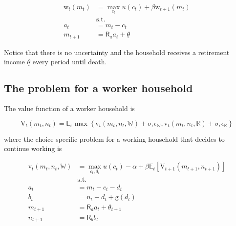 \documentclass{article}
\newcommand{\DiscFac}{\beta}
\newcommand{\VFunc}{\mathrm{V}}
\newcommand{\util}{u}
\newcommand{\tShkEmp}{\theta}
\newcommand{\Ex}{\mathbb{E}}
\newcommand{\bRat}{b}
\newcommand{\cRat}{c}
\newcommand{\vFunc}{\mathrm{v}}
\newcommand{\Rfree}{\mathsf{R}}
\newcommand{\aRat}{a}
\newcommand{\mRat}{m}
\newcommand{\nRat}{n}
\newcommand{\dRat}{d}
\newcommand{\gFunc}{\mathrm{g}}
\newcommand{\wFunc}{\mathrm{w}}
\newcommand{\Retire}{\mathbb{R}}
\newcommand{\Work}{\mathbb{W}}
\newcommand{\error}{\epsilon}
\newcommand{\kapShare}{\alpha}
\begin{document}
\begin{equation}
\begin{split}
        \wFunc_{t}(\mRat_{t}) & = \max_{\cRat_{t}} \util(\cRat_{t}) +
        \DiscFac \wFunc_{t+1}(\mRat_{t}) \\
        & \text{s.t.} \\
        \aRat_{t} & = \mRat_{t} - \cRat_{t} \\
        \mRat_{t+1} & = \Rfree_{\aRat} \aRat_{t} +
        \underline{\tShkEmp}
    \end{split}
\end{equation}

Notice that there is no uncertainty and the household receives a retirement
income $\underline{\tShkEmp}$ every period until death.

\subsection{The problem for a worker household}\label{The problem for a worker household}

The value function of a worker household is

\begin{equation}
\VFunc_{t}(\mRat_{t}, \nRat_{t}) = \Ex_\error \max \left\{
    \vFunc_{t}(\mRat_{t}, \nRat_{t}, \Work) + \sigma_{\error}
    \error_{\Work} ,
    \vFunc_{t}(\mRat_{t}, \nRat_{t}, \Retire) + \sigma_{\error}
    \error_{\Retire} \right\}
\end{equation}

where the choice specific problem for a working household that decides to
continue working is

\begin{equation}
\begin{split}
        \vFunc_{t}(\mRat_{t}, \nRat_{t}, \Work) & = \max_{\cRat_{t},
            \dRat_{t}} \util(\cRat_{t}) - \kapShare + \DiscFac
        \Ex_{t} \left[
            \VFunc_{t+1}(\mRat_{t+1}, \nRat_{t+1})
            \right] \\
        & \text{s.t.} \\
        \aRat_{t} & = \mRat_{t} - \cRat_{t} - \dRat_{t} \\
        \bRat_{t} & = \nRat_{t} + \dRat_{t} + \gFunc(\dRat_{t}) \\
        \mRat_{t+1} & = \Rfree_{\aRat} \aRat_{t} + \tShkEmp_{t+1} \\
        \nRat_{t+1} & = \Rfree_{\bRat} \bRat_{t}
    \end{split}
\end{equation}
\end{document}
